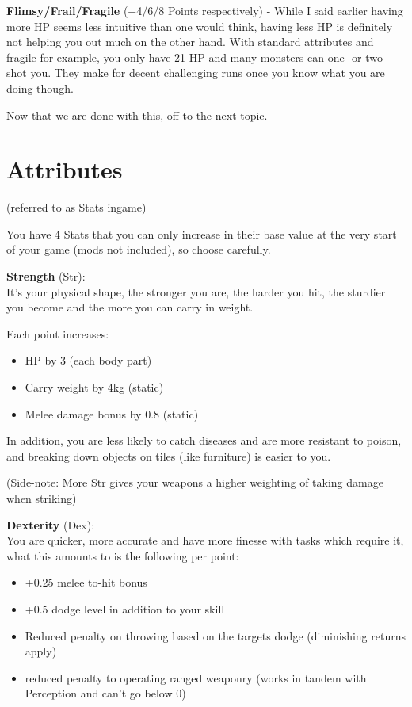 \textbf{Flimsy/Frail/Fragile} (+4/6/8 Points respectively) - While I said earlier having more HP seems less intuitive than one would think, having less HP is definitely not helping you out much on the other hand. With standard attributes and fragile for example, you only have 21 HP and many monsters can one- or two-shot you. They make for decent challenging runs once you know what you are doing though.

Now that we are done with this, off to the next topic.

\section{Attributes}

(referred to as Stats ingame)

You have 4 Stats that you can only increase in their base value at the very start of your game (mods not included), so choose carefully.

\textbf{Strength} (Str):\\It's your physical shape, the stronger you are, the harder you hit, the sturdier you become and the more you can carry in weight.

Each point increases:
\begin{itemize}
\item HP by 3 (each body part)
\item Carry weight by 4kg (static)
\item Melee damage bonus by 0.8 (static)
\end{itemize}

In addition, you are less likely to catch diseases and are more resistant to poison, and breaking down objects on tiles (like furniture) is easier to you.

(Side-note: More Str gives your weapons a higher weighting of taking damage when striking)

\textbf{Dexterity} (Dex):\\You are quicker, more accurate and have more finesse with tasks which require it, what this amounts to is the following per point:
\begin{itemize}
\item +0.25 melee to-hit bonus
\item +0.5 dodge level in addition to your skill
\item Reduced penalty on throwing based on the targets dodge (diminishing returns apply)
\item reduced penalty to operating ranged weaponry (works in tandem with Perception and can't go below 0)
\end{itemize}

